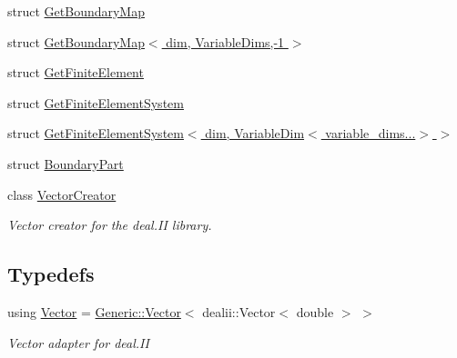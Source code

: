 \begin{DoxyCompactItemize}
\item 
struct \hyperlink{structSpacy_1_1dealII_1_1GetBoundaryMap}{Get\-Boundary\-Map}
\item 
struct \hyperlink{structSpacy_1_1dealII_1_1GetBoundaryMap_3_01dim_00_01VariableDims_00-1_01_4}{Get\-Boundary\-Map$<$ dim, Variable\-Dims,-\/1 $>$}
\item 
struct \hyperlink{structSpacy_1_1dealII_1_1GetFiniteElement}{Get\-Finite\-Element}
\item 
struct \hyperlink{structSpacy_1_1dealII_1_1GetFiniteElementSystem}{Get\-Finite\-Element\-System}
\item 
struct \hyperlink{structSpacy_1_1dealII_1_1GetFiniteElementSystem_3_01dim_00_01VariableDim_3_01variable__dims_8_8_8_4_01_4}{Get\-Finite\-Element\-System$<$ dim, Variable\-Dim$<$ variable\-\_\-dims...$>$ $>$}
\item 
struct \hyperlink{structSpacy_1_1dealII_1_1BoundaryPart}{Boundary\-Part}
\item 
class \hyperlink{classSpacy_1_1dealII_1_1VectorCreator}{Vector\-Creator}
\begin{DoxyCompactList}\small\item\em Vector creator for the deal.\-I\-I library. \end{DoxyCompactList}\end{DoxyCompactItemize}
\subsection*{Typedefs}
\begin{DoxyCompactItemize}
\item 
using \hyperlink{group__VectorSpaceGroup_ga65d64ee5f22f492639d0f950aa931071}{Vector} = \hyperlink{classSpacy_1_1Generic_1_1Vector}{Generic\-::\-Vector}$<$ dealii\-::\-Vector$<$ double $>$ $>$
\begin{DoxyCompactList}\small\item\em Vector adapter for deal.\-I\-I \end{DoxyCompactList}\end{DoxyCompactItemize}
